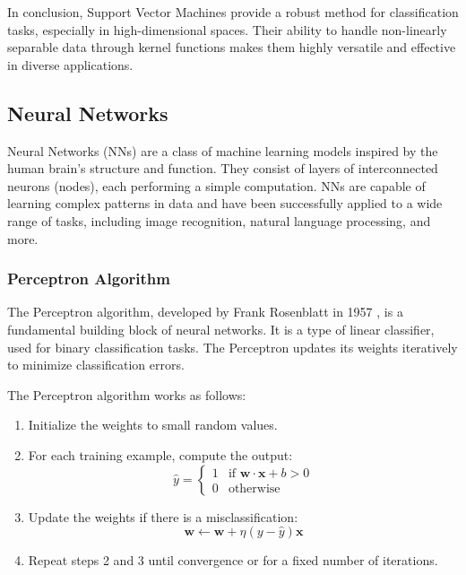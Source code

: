 \documentclass[english,11pt,a4paper,titlepage]{article}
\begin{document}
	In conclusion, Support Vector Machines provide a robust method for classification tasks, especially in high-dimensional spaces. Their ability to handle non-linearly separable data through kernel functions makes them highly versatile and effective in diverse applications.
	
	
	\subsection*{Neural Networks}
	Neural Networks (NNs) are a class of machine learning models inspired by the human brain's structure and function. They consist of layers of interconnected neurons (nodes), each performing a simple computation. NNs are capable of learning complex patterns in data and have been successfully applied to a wide range of tasks, including image recognition, natural language processing, and more.
	
	\subsubsection*{Perceptron Algorithm}
	The Perceptron algorithm, developed by Frank Rosenblatt in 1957 \cite{rosenblattPerceptronProbabilisticModel1958}, is a fundamental building block of neural networks. It is a type of linear classifier, used for binary classification tasks. The Perceptron updates its weights iteratively to minimize classification errors.

	The Perceptron algorithm works as follows:
	\begin{enumerate}
		\item Initialize the weights to small random values.
		\item For each training example, compute the output:
		\begin{equation*}
			\hat{y} = \begin{cases}
				1 & \text{if } \mathbf{w} \cdot \mathbf{x} + b > 0 \\
				0 & \text{otherwise}
			\end{cases}
		\end{equation*}
		\item Update the weights if there is a misclassification:
		\begin{equation*}
			\mathbf{w} \leftarrow \mathbf{w} + \eta (y - \hat{y}) \mathbf{x}
		\end{equation*}
		\item Repeat steps 2 and 3 until convergence or for a fixed number of iterations.
	\end{enumerate}
	
\end{document}
